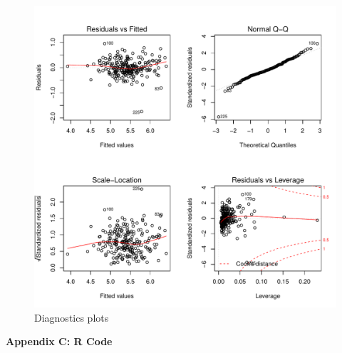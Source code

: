 \documentclass[11pt]{article}\usepackage[]{graphicx}\usepackage[]{color}
\makeatletter
\def\maxwidth{ %
  \ifdim\Gin@nat@width>\linewidth
    \linewidth
  \else
    \Gin@nat@width
  \fi
}
\makeatother
\begin{document}
\begin{figure}[h!] 
\begin{center}

\includegraphics[width=\maxwidth]{figure/unnamed-chunk-14-1} 

\caption{Diagnostics plots}
\label{diag-plot2}
\end{center} 
\end{figure}

\clearpage
\newpage
\noindent \Large{{\bf Appendix C: R Code}}

\end{document}
